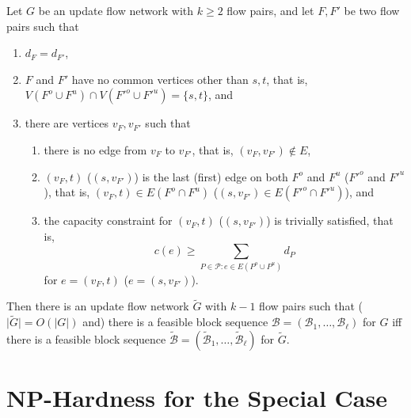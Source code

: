 \documentclass[fontsize=11pt,paper=a4]{book}
\begin{document}
\begin{lem}
Let \(G\) be an update flow network with \(k\geq 2\) flow pairs, and let \(F,F'\) be two flow pairs such that

\begin{enumerate}
\item \label{itm:lem-merging-flow-pairs-property-1}
\(d_F=d_{F'}\),

\item \label{itm:lem-merging-flow-pairs-property-2}
\(F\) and \(F'\) have no common vertices other than \(s,t\), that is, \(V(F^o\cup F^u)\cap V(F'^o\cup F'^u)=\{s,t\}\), and

\item \label{itm:lem-merging-flow-pairs-property-3}
there are vertices \(v_F,v_{F'}\) such that

\begin{enumerate}
\item \label{itm:lem-merging-flow-pairs-property-3-1}
there is no edge from \(v_F\) to \(v_{F'}\), that is, \((v_F,v_{F'})\notin E\),

\item \label{itm:lem-merging-flow-pairs-property-3-2}
\((v_F,t)\) (\((s,v_{F'})\)) is the last (first) edge on both \(F^o\) and \(F^u\) (\(F'^o\) and \(F'^u\)), that is, \((v_F,t)\in E(F^o\cap F^u)\) (\((s,v_{F'})\in E(F'^o\cap F'^u)\)), and

\item \label{itm:lem-merging-flow-pairs-property-3-3}
the capacity constraint for \((v_F,t)\) (\((s,v_{F'})\)) is trivially satisfied, that is,
\[
      c(e)\geq\sum_{P\in\mathcal{P}:e\in E(P^o\cup P^u)}d_P
      \]
for \(e=(v_F,t)\) (\(e=(s,v_{F'})\)).
\end{enumerate}
\end{enumerate}


Then there is an update flow network \(\tilde{G}\) with \(k-1\) flow pairs such that (\(\lvert\tilde{G}\rvert=O(\lvert G\rvert)\) and) there is a feasible block sequence \(\mathcal{B}=(\mathscr{B}_1,\dots,\mathscr{B}_{\ell})\) for \(G\) iff there is a feasible block sequence \(\tilde{\mathcal{B}}=(\tilde{\mathscr{B}}_1,\dots,\tilde{\mathscr{B}}_{\ell})\) for \(\tilde{G}\).
\label{org859ddb4}
\end{lem}

\chapter{\(\textbf{NP}\)-Hardness for the Special Case}
\label{sec:org1021fe8}
\end{document}
